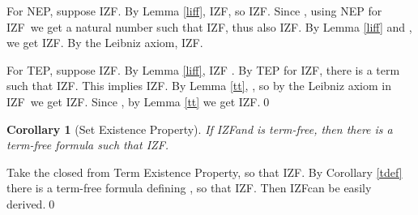 \documentclass{LMCS}
\newtheorem{corollary}[thm]{Corollary}
\newcommand{\ignore}[1]{}
\newcommand{\izfr}{IZF}
\newcommand{\iizf}{IZF}
\begin{document}
For NEP, suppose \izfr . By Lemma
\ref{liff}, \iizf , so \iizf . Since , using NEP for \iizf\ we get
a natural number  such that \iizf , thus also \iizf . By Lemma \ref{liff} and , we get \izfr . By the Leibniz axiom, \izfr .

For TEP, suppose \izfr . By Lemma \ref{liff}, \iizf
. By TEP for \iizf, there is a term  such
that \iizf . This implies \izfr . By Lemma
\ref{tt}, , so by the Leibniz axiom in \izfr\ we get \izfr . 
Since , by Lemma \ref{tt} we get \izfr .\qed


\begin{corollary}[Set Existence Property]\label{sep}
If \izfr  and  is term-free, then
there is a term-free formula  such that \izfr .
\end{corollary}
\proof Take the closed  from Term Existence Property, so that \izfr . By Corollary \ref{tdef} there is a term-free formula  defining , so that
\izfr . Then \izfr  can be easily derived.\qed


\ignore{

We cannot establish TEP and SEP as easily, since it is not
the case that  for all terms . The problem lies in terms
corresponding to the Power Set, Separation and Replacement axioms. 
However, a simple modification to the axiomatization of \izfr\ yields these results too.
It suffices to incorporate the restriction to  into troublesome terms.
Since in the extensional universe  holds, the modification is harmless.

More formally, we modify three axioms of \izfr\ and add one new, 
axiomatizing transitive closure. Let  be the formula `` and  is transitive''. The axioms are:
\begin{enumerate}[]
\item (SEP') 
\item (POWER') 
\item (REPL') 
\item (TC) . 
\end{enumerate}

In the modified axioms, the definition of  is written using  and
relativization of formulas to  this time leaves terms intact, we set  for all terms . 

It is not difficult to see that this axiomatization is equivalent to the old
one and is still a definitional extension of term-free versions of \cite{myhill72}, \cite{beesonbook} and \cite{frsce3}.We can therefore adopt it as the official axiomatization of \izfr.
All the developments in sections 4-8 can be done for the new axiomatization in the similar way. 
In the end we get:
\begin{corollary}\label{dpneptepsep}
\izfr\  satisfies DP, NEP, TEP and SEP. 
\end{corollary}
}
\end{document}
